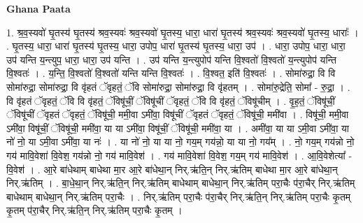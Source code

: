 \documentclass[17pt]{extarticle}
\begin{document}
\textbf{Ghana Paata } \newline

1. श्र॒व॒स्यवो॑ घृ॒तस्य॑ घृ॒तस्य॑ श्रव॒स्यवः॑ श्रव॒स्यवो॑ घृ॒तस्य॒ धारा॒ धारा॑ घृ॒तस्य॑ श्रव॒स्यवः॑ श्रव॒स्यवो॑ घृ॒तस्य॒ धाराः᳚ । . घृ॒तस्य॒ धारा॒ धारा॑ घृ॒तस्य॑ घृ॒तस्य॒ धारा॒ उपोप॒ धारा॑ घृ॒तस्य॑ घृ॒तस्य॒ धारा॒ उप॑ । . धारा॒ उपोप॒ धारा॒ धारा॒ उप॑ यन्ति य॒न्त्युप॒ धारा॒ धारा॒ उप॑ यन्ति । . उप॑ यन्ति य॒न्त्युपोप॑ यन्ति वि॒श्वतो॑ वि॒श्वतो॑ य॒न्त्युपोप॑ यन्ति वि॒श्वतः॑ । . य॒न्ति॒ वि॒श्वतो॑ वि॒श्वतो॑ यन्ति यन्ति वि॒श्वतः॑ । . वि॒श्वत॒ इति॑ वि॒श्वतः॑ । . सोमा॑रुद्रा॒ वि वि सोमा॑रुद्रा॒ सोमा॑रुद्रा॒ वि वृ॑हतं ॅवृहतं॒ ॅवि सोमा॑रुद्रा॒ सोमा॑रुद्रा॒ वि वृ॑हतम् । . सोमा॑रु॒द्रेति॒ सोमा᳚ - रु॒द्रा॒ । . वि वृ॑हतं ॅवृहतं॒ ॅवि वि वृ॑हतं॒ ॅविषू॑चीं॒ ॅविषू॑चीं ॅवृहतं॒ ॅवि वि वृ॑हतं॒ ॅविषू॑चीम् । . वृ॒ह॒तं॒ ॅविषू॑चीं॒ ॅविषू॑चीं ॅवृहतं ॅवृहतं॒ ॅविषू॑ची॒ ममी॒वा ऽमी॑वा॒ विषू॑चीं ॅवृहतं ॅवृहतं॒ ॅविषू॑ची॒ ममी॑वा । . विषू॑ची॒ ममी॒वा ऽमी॑वा॒ विषू॑चीं॒ ॅविषू॑ची॒ ममी॑वा॒ या या ऽमी॑वा॒ विषू॑चीं॒ ॅविषू॑ची॒ ममी॑वा॒ या । . अमी॑वा॒ या या ऽमी॒वा ऽमी॑वा॒ या नो॑ नो॒ या ऽमी॒वा ऽमी॑वा॒ या नः॑ । . या नो॑ नो॒ या या नो॒ गय॒म् गय॑न्नो॒ या या नो॒ गय᳚म् । . नो॒ गय॒म् गय॑न्नो नो॒ गय॑ मावि॒वेशा॑ वि॒वेश॒ गय॑न्नो नो॒ गय॑ मावि॒वेश॑ । . गय॑ मावि॒वेशा॑ वि॒वेश॒ गय॒म् गय॑ मावि॒वेश॑ । . आ॒वि॒वेशेत्या᳚ - वि॒वेश॑ । . आ॒रे बा॑धेथाम् बाधेथा मा॒र आ॒रे बा॑धेथा॒न् निर्.ऋ॑ति॒न् निर्.ऋ॑तिम् बाधेथा मा॒र आ॒रे बा॑धेथा॒न् निर्.ऋ॑तिम् । . बा॒धे॒था॒न् निर्.ऋ॑ति॒न् निर्.ऋ॑तिम् बाधेथाम् बाधेथा॒न् निर्.ऋ॑तिम् परा॒चैः प॑रा॒चैर् निर्.ऋ॑तिम् बाधेथाम् बाधेथा॒न् निर्.ऋ॑तिम् परा॒चैः । . निर्.ऋ॑तिम् परा॒चैः प॑रा॒चैर् निर्.ऋ॑ति॒न् निर्.ऋ॑तिम् परा॒चैः कृ॒तम् कृ॒तम् प॑रा॒चैर् निर्.ऋ॑ति॒न् निर्.ऋ॑तिम् परा॒चैः कृ॒तम् । \newline
\end{document}
